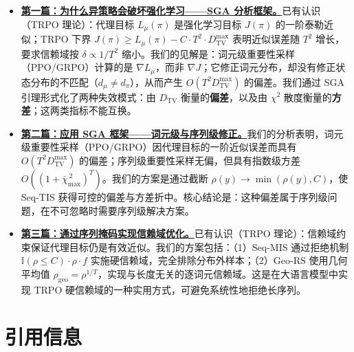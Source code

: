 
\begin{itemize}

\item \href{https://richardli.xyz/rl-collapse-1}{\textbf{第一篇：为什么异策略会破坏强化学习——SGA 分析框架。}}已有认识（TRPO 理论）：代理目标 $L_\mu(\pi)$ 是强化学习目标 $J(\pi)$ 的一阶泰勒近似；TRPO 下界 $J(\pi)\ge L_\mu(\pi)-C\cdot T^2\cdot D_{\mathrm{TV}}^{\max}$ 表明近似误差随 $T^2$ 增长，要求信赖域按 $\delta\propto 1/T^2$ 缩小。我们的见解是：词元级重要性采样（PPO/GRPO）计算的是 $\nabla L_\mu$，而非 $\nabla J$；它修正词元分布，却没有修正状态分布的不匹配（$d_\mu\ne d_\pi$），从而产生 $O(T^2D_{\mathrm{TV}}^{\max})$ 的偏差。我们通过 SGA 引理形式化了两种失效模式：由 $D_{\mathrm{TV}}$ 衡量的\textbf{偏差}，以及由 $\chi^2$ 散度衡量的\textbf{方差}；这两类指标不能互换。


\item \href{https://richardli.xyz/rl-collapse-2}{\textbf{第二篇：应用 SGA 框架——词元级与序列级修正。}}我们的分析表明，词元级重要性采样（PPO/GRPO）因代理目标的一阶近似误差而具有 $O(T^2D_{\mathrm{TV}}^{\max})$ 的偏差；序列级重要性采样无偏，但具有指数级方差 $O((1+\bar{\chi}_{\max}^{\,2})^T)$。我们的方案是通过截断 $\rho(y)\to\min(\rho(y),C)$，使 Seq-TIS 获得可控的偏差与方差折中。核心结论是：这种偏差属于序列级问题，在不可忽略时需要序列级解决方案。


\item \href{https://richardli.xyz/rl-collapse-3}{\textbf{第三篇：通过序列掩码实现信赖域优化。}}已有认识（TRPO 理论）：信赖域约束保证代理目标仍是有效近似。我们的方案包括：（1）Seq-MIS 通过拒绝机制 $\mathbb{I}(\rho\le C)\cdot\rho\cdot f$ 实施硬信赖域，完全排除分布外样本；（2）Geo-RS 使用几何平均值 $\rho_{\mathrm{geo}}=\rho^{1/T}$，实现与长度无关的逐词元信赖域。这是在大语言模型中实现 TRPO 硬信赖域的一种实用方式，可避免系统性地拒绝长序列。

\end{itemize}



\hypertarget{src-271211a5-58b7-8057-a4a9-fe5550d04cb1}{}
\section*{引用信息}
{}




